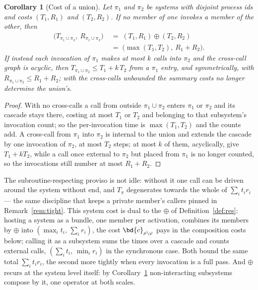 \documentclass[10pt,oneside,openany]{book}
\theoremstyle{accentdef}
\theoremstyle{accentplain}
\newtheorem{corollary}[definition]{Corollary}
\begin{document}
\begin{corollary}[Cost of a union]\label{cor:syscost}
Let $\pi_1$ and $\pi_2$ be systems with disjoint process ids and costs $(T_1,R_1)$ and
$(T_2,R_2)$. If no member of one invokes a member of the other, then
\[
  \begin{aligned}
  \bigl(T_{\pi_1 \cup \pi_2},\ R_{\pi_1 \cup \pi_2}\bigr) &\;=\; (T_1,R_1) \oplus (T_2,R_2) \\
  &\;=\; \bigl(\max(T_1,T_2),\ R_1 + R_2\bigr) .
  \end{aligned}
\]
If instead each invocation of $\pi_1$ makes at most $k$ calls into $\pi_2$ and the cross-call graph
is acyclic, then $T_{\pi_1 \cup \pi_2} \le T_1 + k\,T_2$ from a $\pi_1$ entry, and symmetrically,
with $R_{\pi_1 \cup \pi_2} \le R_1 + R_2$; with the cross-calls unbounded the summary costs no
longer determine the union's.
\end{corollary}

\begin{proof}
With no cross-calls a call from outside $\pi_1 \cup \pi_2$ enters $\pi_1$ or $\pi_2$ and its cascade
stays there, costing at most $T_1$ or $T_2$ and belonging to that subsystem's invocation count; so
the per-invocation time is $\max(T_1,T_2)$ and the counts add. A cross-call from $\pi_1$ into
$\pi_2$ is internal to the union and extends the cascade by one invocation of $\pi_2$, at most $T_2$
steps; at most $k$ of them, acyclically, give $T_1 + k T_2$, while a call once external to $\pi_2$
but placed from $\pi_1$ is no longer counted, so the invocations still number at most $R_1 + R_2$.
\end{proof}

The subroutine-respecting proviso is not idle: without it one call can be driven around the system
without end, and $T_\pi$ degenerates towards the whole of $\sum_i t_i r_i$ --- the same discipline
that keeps a private member's callers pinned in Remark~\ref{rem:tight}. This system cost is dual to
the $\oplus$ of Definition~\ref{def:res}: hosting a system as a bundle, one member per activation,
combines its members by $\oplus$ into $(\max_i t_i,\, \sum_i r_i)$, the cost
$\bd{c}_{\rho \setminus \varphi}$ pays in the composition costs below; calling it as a subsystem
sums the times over a cascade and counts external calls, $(\sum_i t_i,\, \min_i r_i)$ in the
synchronous case. Both bound the same total $\sum_i t_i r_i$, the second more tightly when every
invocation is a full pass. And $\oplus$ recurs at the system level itself: by
Corollary~\ref{cor:syscost} non-interacting subsystems compose by it, one operator at both scales.
\end{document}
